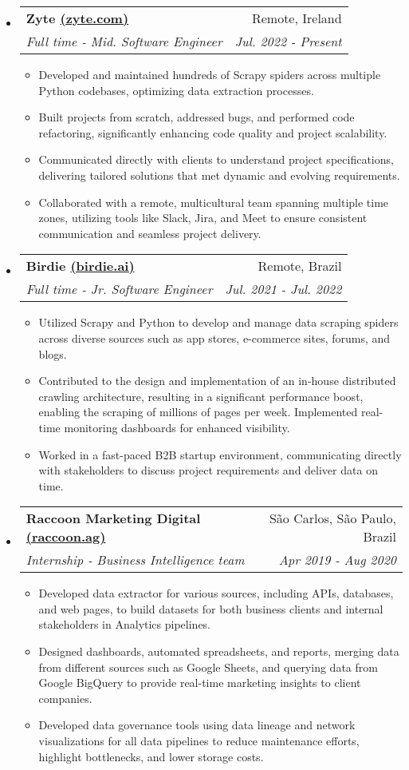 \documentclass[letterpaper,11pt]{article}
\makeatletter
\newcommand{\resumeItemNoTitle}[1]{
    \item\small{
        {#1 \vspace{-2pt}}
    }
}
\newcommand{\resumeSubheading}[4]{
  \vspace{-1pt}\item
    \begin{tabular*}{0.97\textwidth}[t]{l@{\extracolsep{\fill}}r}
      \textbf{#1} & #2 \\
      \textit{\small#3} & \textit{\small #4} \\
    \end{tabular*}\vspace{-5pt}
}
\newcommand{\resumeSubHeadingListStart}{\begin{itemize}[leftmargin=*]}
\newcommand{\resumeSubHeadingListEnd}{\end{itemize}}
\newcommand{\resumeItemListStart}{\begin{itemize}[leftmargin=*]\setlength\itemsep{1mm}}
\newcommand{\resumeItemListEnd}{\end{itemize}\vspace{-5pt}}
\makeatother
\begin{document}
\resumeSubHeadingListStart
  \resumeSubheading
      {Zyte \href{https://zyte.com}{(zyte.com)}}{Remote, Ireland}
      {Full time - Mid. Software Engineer}{Jul. 2022 - Present}
      \resumeItemListStart
        \resumeItemNoTitle
            {
            Developed and maintained hundreds of Scrapy spiders across multiple Python codebases, optimizing data extraction processes.
            }
        \resumeItemNoTitle
            {
            Built projects from scratch, addressed bugs, and performed code refactoring, significantly enhancing code quality and project scalability.
            }
        \resumeItemNoTitle
            {
            Communicated directly with clients to understand project specifications, delivering tailored solutions that met dynamic and evolving requirements.
            }
        \resumeItemNoTitle
            {
            Collaborated with a remote, multicultural team spanning multiple time zones, utilizing tools like Slack, Jira, and Meet to ensure consistent communication and seamless project delivery.
            }
      \resumeItemListEnd
  \resumeSubheading
      {Birdie \href{https://birdie.ai}{(birdie.ai)}}{Remote, Brazil}
      {Full time - Jr. Software Engineer}{Jul. 2021 - Jul. 2022}
      \resumeItemListStart
        \resumeItemNoTitle
          {
          Utilized Scrapy and Python to develop and manage data scraping spiders across diverse sources such as app stores, e-commerce sites, forums, and blogs.
          }
        \resumeItemNoTitle
          {
           Contributed to the design and implementation of an in-house distributed crawling architecture, resulting in a significant performance boost, enabling the scraping of millions of pages per week. Implemented real-time monitoring dashboards for enhanced visibility.
          }
        \resumeItemNoTitle
          {
          Worked in a fast-paced B2B startup environment, communicating directly with stakeholders to discuss project requirements and deliver data on time.
          }
      \resumeItemListEnd
    \resumeSubheading
      {Raccoon Marketing Digital \href{https://birdie.ai}{(raccoon.ag)}}{São Carlos, São Paulo, Brazil}
      {Internship - Business Intelligence team}{Apr 2019 - Aug 2020}
      \resumeItemListStart
        \resumeItemNoTitle
        {
        Developed data extractor for various sources, including APIs, databases, and web pages, to build datasets for both business clients and internal stakeholders in Analytics pipelines.
        }
        \resumeItemNoTitle
          {
          Designed dashboards, automated spreadsheets, and reports, merging data from different sources such as Google Sheets, and querying data from Google BigQuery to provide real-time marketing insights to client companies.
          }
          \resumeItemNoTitle
          {
          Developed data governance tools using data lineage and network visualizations for all data pipelines to reduce maintenance efforts, highlight bottlenecks, and lower storage costs.
          }
      \resumeItemListEnd
  \resumeSubHeadingListEnd
  
\end{document}

